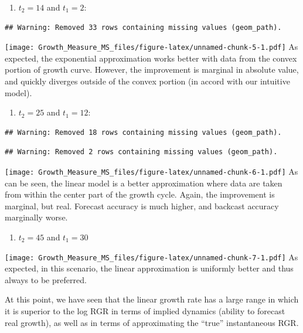 \documentclass[]{article}
\providecommand{\tightlist}{%
  \setlength{\itemsep}{0pt}\setlength{\parskip}{0pt}}
\begin{document}
\begin{enumerate}
\def\labelenumi{\arabic{enumi})}
\tightlist
\item
  \(t_2 = 14\) and \(t_1=2\):
\end{enumerate}

\begin{verbatim}
## Warning: Removed 33 rows containing missing values (geom_path).
\end{verbatim}

\texttt{[image: Growth\_Measure\_MS\_files/figure-latex/unnamed-chunk-5-1.pdf]}
As expected, the exponential approximation works better with data from
the convex portion of growth curve. However, the improvement is marginal
in absolute value, and quickly diverges outside of the convex portion
(in accord with our intuitive model).

\begin{enumerate}
\def\labelenumi{\arabic{enumi})}
\setcounter{enumi}{1}
\tightlist
\item
  \(t_2 = 25\) and \(t_1 = 12\):
\end{enumerate}

\begin{verbatim}
## Warning: Removed 18 rows containing missing values (geom_path).
\end{verbatim}

\begin{verbatim}
## Warning: Removed 2 rows containing missing values (geom_path).
\end{verbatim}

\texttt{[image: Growth\_Measure\_MS\_files/figure-latex/unnamed-chunk-6-1.pdf]}
As can be seen, the linear model is a better approximation where data
are taken from within the center part of the growth cycle. Again, the
improvement is marginal, but real. Forecast accuracy is much higher, and
backcast accuracy marginally worse.

\begin{enumerate}
\def\labelenumi{\arabic{enumi})}
\setcounter{enumi}{2}
\tightlist
\item
  \(t_2=45\) and \(t_1=30\)
\end{enumerate}

\texttt{[image: Growth\_Measure\_MS\_files/figure-latex/unnamed-chunk-7-1.pdf]}
As expected, in this scenario, the linear approximation is uniformly
better and thus always to be preferred.

At this point, we have seen that the linear growth rate has a large
range in which it is superior to the log RGR in terms of implied
dynamics (ability to forecast real growth), as well as in terms of
approximating the ``true'' instantaneous RGR.
\end{document}
